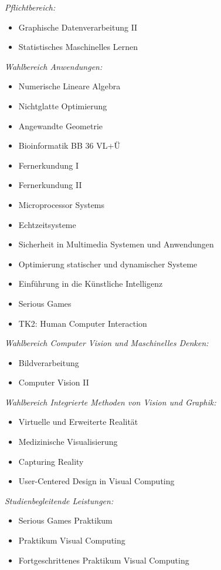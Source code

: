 {\textit{Pflichtbereich:}
\begin{itemize}[noitemsep]
  \item Graphische Datenverarbeitung II
  \item Statistisches Maschinelles Lernen
\end{itemize}
\textit{Wahlbereich Anwendungen:}
\begin{itemize}[noitemsep]
  \item Numerische Lineare Algebra
  \item Nichtglatte Optimierung
  \item Angewandte Geometrie
  \item Bioinformatik BB 36 VL+Ü
  \item Fernerkundung I
  \item Fernerkundung II
  \item Microprocessor Systems
  \item Echtzeitsysteme
  \item Sicherheit in Multimedia Systemen und Anwendungen
  \item Optimierung statischer und dynamischer Systeme
  \item Einführung in die Künstliche Intelligenz
  \item Serious Games
  \item TK2: Human Computer Interaction
\end{itemize}
\textit{Wahlbereich Computer Vision und Maschinelles Denken:}
\begin{itemize}[noitemsep]
  \item Bildverarbeitung
  \item Computer Vision II
\end{itemize}
\textit{Wahlbereich Integrierte Methoden von Vision und Graphik:}
\begin{itemize}[noitemsep]
  \item Virtuelle und Erweiterte Realität
  \item Medizinische Visualisierung
  \item Capturing Reality
  \item User-Centered Design in Visual Computing
\end{itemize}
\textit{Studienbegleitende Leistungen:}
\begin{itemize}[noitemsep]
  \item Serious Games Praktikum
  \item Praktikum Visual Computing
  \item Fortgeschrittenes Praktikum Visual Computing

\end{itemize}}
